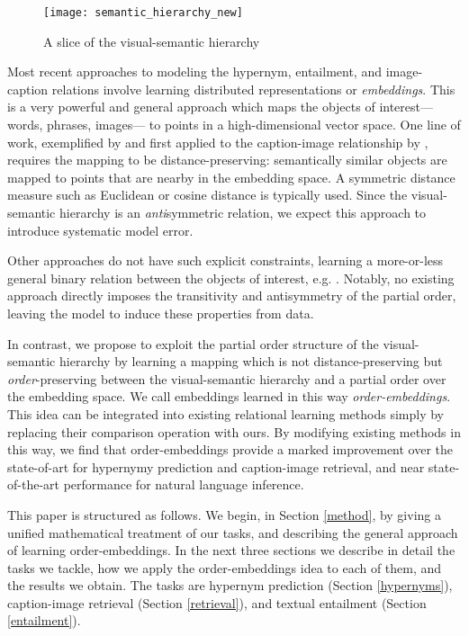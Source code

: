 \documentclass{article} \usepackage{iclr2016_conference,times}
\begin{document}
\begin{figure}[h]
	\centering
	\texttt{[image: semantic\_hierarchy\_new]}
	\caption{A slice of the visual-semantic hierarchy}
	\label{fig:sem}
\end{figure}


Most recent approaches to modeling the hypernym, entailment, and image-caption relations involve learning distributed representations or \emph{embeddings}. This is a very powerful and general approach which maps the objects of interest---words, phrases, images--- to points in a high-dimensional vector space.
One line of work, exemplified by \citet{chopra2005learning} and first applied to the caption-image relationship by \citet{socher2014grounded}, requires the mapping to be distance-preserving: semantically similar objects are mapped to points that are nearby in the embedding space. A symmetric distance measure such as Euclidean or cosine distance is typically used. Since the visual-semantic hierarchy is an \emph{anti}symmetric relation, we expect this approach to introduce systematic model error.

Other approaches do not have such explicit constraints, learning a more-or-less general binary relation between the objects of interest, e.g. \citet{bordes2011learning,socher2013reasoning,ma2015multimodal}. Notably, no existing approach directly imposes the transitivity and antisymmetry of the partial order, leaving the model to induce these properties from data. 


In contrast, we propose to exploit the partial order structure of the visual-semantic hierarchy by learning a mapping which is not distance-preserving but \emph{order}-preserving between the visual-semantic hierarchy and a partial order over the embedding space. We call embeddings learned in this way \emph{order-embeddings}. This idea can be integrated into existing relational learning methods simply by replacing their comparison operation with ours. By modifying existing methods in this way, we find that order-embeddings provide a marked improvement over the state-of-art for hypernymy prediction and caption-image retrieval, and near state-of-the-art performance for natural language inference. 









This paper is structured as follows. We begin, in Section \ref{method}, by giving a unified mathematical treatment of our tasks, and describing the general approach of learning order-embeddings. In the next three sections we describe in detail the  tasks we tackle, how we apply the order-embeddings idea to each of them, and the results we obtain. The tasks are hypernym prediction (Section \ref{hypernyms}), caption-image retrieval (Section \ref{retrieval}), and textual entailment (Section \ref{entailment}).
\end{document}
